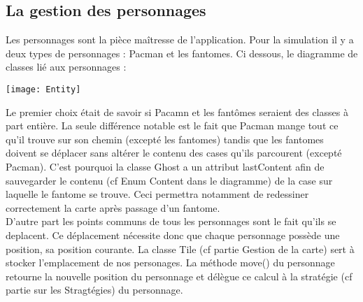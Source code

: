 \subsection{La gestion des personnages}

Les personnages sont la pièce maîtresse de l'application. Pour la simulation il y a deux types de personnages : Pacman et les fantomes.
Ci dessous, le diagramme de classes lié aux personnages : \\[0.5cm]
\centerline{\texttt{[image: Entity]}}

Le premier choix était de savoir si Pacamn et les fantômes seraient des classes à part entière. La seule différence notable est le fait que Pacman mange tout ce qu'il trouve sur son chemin (excepté les fantomes) tandis que les fantomes doivent se déplacer sans altérer le contenu des cases qu'ils parcourent (excepté Pacman). C'est pourquoi la classe Ghost a un attribut lastContent afin de sauvegarder le contenu (cf Enum Content dans le diagramme) de la case sur laquelle le fantome se trouve.
Ceci permettra notamment de redessiner correctement la carte après passage d'un fantome. \\
D'autre part les points communs de tous les personnages sont le fait qu'ils se deplacent. Ce déplacement nécessite donc que chaque personnage possède une position, sa position courante. La classe Tile (cf partie Gestion de la carte) sert à stocker l'emplacement de nos personages. La méthode move() du personnage retourne la nouvelle position du personnage et délègue ce calcul à la stratégie (cf partie sur les Stragtégies) du personnage.

